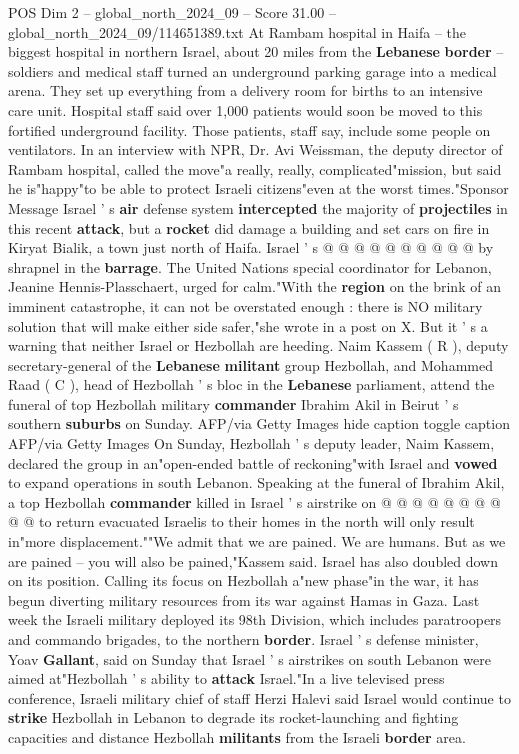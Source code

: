 \begin{textsample}{POS Dim 2 – global\_north\_2024\_09 – Score 31.00 – global\_north\_2024\_09/114651389.txt}
At Rambam hospital in Haifa -- the biggest hospital in northern Israel, about 20 miles from the \textbf{Lebanese} \textbf{border} -- soldiers and medical staff turned an underground parking garage into a medical arena.
They set up everything from a delivery room for births to an intensive care unit.
Hospital staff said over 1,000 patients would soon be moved to this fortified underground facility.
Those patients, staff say, include some people on ventilators.
In an interview with NPR, Dr.
Avi Weissman, the deputy director of Rambam hospital, called the move"a really, really, complicated"mission, but said he is"happy"to be able to protect Israeli citizens"even at the worst times."Sponsor Message Israel ' s \textbf{air} defense system \textbf{intercepted} the majority of \textbf{projectiles} in this recent \textbf{attack}, but a \textbf{rocket} did damage a building and set cars on fire in Kiryat Bialik, a town just north of Haifa.
Israel ' s @ @ @ @ @ @ @ @ @ @ by shrapnel in the \textbf{barrage}.
The United Nations special coordinator for Lebanon, Jeanine Hennis-Plasschaert, urged for calm."With the \textbf{region} on the brink of an imminent catastrophe, it can not be overstated enough : there is NO military solution that will make either side safer,"she wrote in a post on X.
But it ' s a warning that neither Israel or Hezbollah are heeding.
Naim Kassem ( R ), deputy secretary-general of the \textbf{Lebanese} \textbf{militant} group Hezbollah, and Mohammed Raad ( C ), head of Hezbollah ' s bloc in the \textbf{Lebanese} parliament, attend the funeral of top Hezbollah military \textbf{commander} Ibrahim Akil in Beirut ' s southern \textbf{suburbs} on Sunday.
AFP/via Getty Images hide caption toggle caption AFP/via Getty Images On Sunday, Hezbollah ' s deputy leader, Naim Kassem, declared the group in an"open-ended battle of reckoning"with Israel and \textbf{vowed} to expand operations in south Lebanon.
Speaking at the funeral of Ibrahim Akil, a top Hezbollah \textbf{commander} killed in Israel ' s airstrike on @ @ @ @ @ @ @ @ @ @ to return evacuated Israelis to their homes in the north will only result in"more displacement.""We admit that we are pained.
We are humans.
But as we are pained -- you will also be pained,"Kassem said.
Israel has also doubled down on its position.
Calling its focus on Hezbollah a"new phase"in the war, it has begun diverting military resources from its war against Hamas in Gaza.
Last week the Israeli military deployed its 98th Division, which includes paratroopers and commando brigades, to the northern \textbf{border}.
Israel ' s defense minister, Yoav \textbf{Gallant}, said on Sunday that Israel ' s airstrikes on south Lebanon were aimed at"Hezbollah ' s ability to \textbf{attack} Israel."In a live televised press conference, Israeli military chief of staff Herzi Halevi said Israel would continue to \textbf{strike} Hezbollah in Lebanon to degrade its rocket-launching and fighting capacities and distance Hezbollah \textbf{militants} from the Israeli \textbf{border} area.

\end{textsample}
